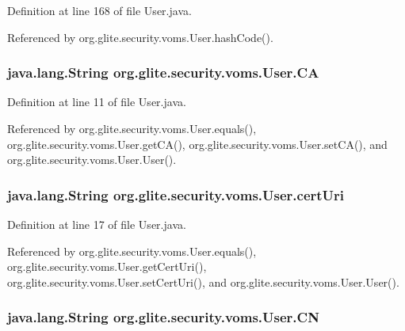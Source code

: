 Definition at line 168 of file User.java.



Referenced by org.glite.security.voms.User.hashCode().

\hypertarget{classorg_1_1glite_1_1security_1_1voms_1_1User_ac2357750b9b3d578955367ff914b07db}{
\subsubsection[{CA}]{\setlength{\rightskip}{0pt plus 5cm}java.lang.String {\bf org.glite.security.voms.User.CA}}}
\label{classorg_1_1glite_1_1security_1_1voms_1_1User_ac2357750b9b3d578955367ff914b07db}


Definition at line 11 of file User.java.



Referenced by org.glite.security.voms.User.equals(), org.glite.security.voms.User.getCA(), org.glite.security.voms.User.setCA(), and org.glite.security.voms.User.User().

\hypertarget{classorg_1_1glite_1_1security_1_1voms_1_1User_ae03c742ad5450dd97e611fa42eca5fb0}{
\subsubsection[{certUri}]{\setlength{\rightskip}{0pt plus 5cm}java.lang.String {\bf org.glite.security.voms.User.certUri}}}
\label{classorg_1_1glite_1_1security_1_1voms_1_1User_ae03c742ad5450dd97e611fa42eca5fb0}


Definition at line 17 of file User.java.



Referenced by org.glite.security.voms.User.equals(), org.glite.security.voms.User.getCertUri(), org.glite.security.voms.User.setCertUri(), and org.glite.security.voms.User.User().

\hypertarget{classorg_1_1glite_1_1security_1_1voms_1_1User_a21fdc685617e5e8e93eb94323986a57c}{
\subsubsection[{CN}]{\setlength{\rightskip}{0pt plus 5cm}java.lang.String {\bf org.glite.security.voms.User.CN}}}
\label{classorg_1_1glite_1_1security_1_1voms_1_1User_a21fdc685617e5e8e93eb94323986a57c}


